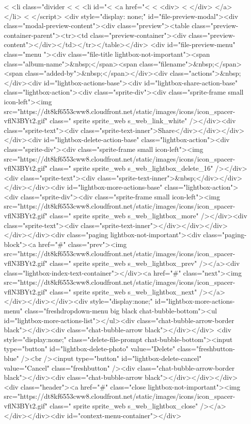 {<%
  <li class="divider <%
<%
  <li id="<%
    <a href="<%
      <%
      <div>
          <%
      </div>
    </a>
  </li>
<%
</script>
<div style="display: none;" id="file-preview-modal"><div class="modal-preview-content"><div class="preview"><table class="preview-container-parent"><tr><td class="preview-container"><div class="preview-content"></div></td></tr></table></div> <div id="file-preview-menu" class="menu "><div class="file-title lightbox-not-important"><span class="album-name">&nbsp;</span><span class="filename">&nbsp;</span><span class="added-by">&nbsp;</span></div><div class="actions">&nbsp;</div><div id="lightbox-actions-base"><div id="lightbox-share-action-base" class="lightbox-action"><div class="sprite-div"><div class="sprite-frame small icon-left"><img src="https://dt8kf6553cww8.cloudfront.net/static/images/icons/icon_spacer-vflN3BYt2.gif" class=" sprite sprite_web s_web_link_white" /></div><div class="sprite-text"><div class="sprite-text-inner">Share</div></div></div></div><div id="lightbox-delete-action-base" class="lightbox-action"><div class="sprite-div"><div class="sprite-frame small icon-left"><img src="https://dt8kf6553cww8.cloudfront.net/static/images/icons/icon_spacer-vflN3BYt2.gif" class=" sprite sprite_web s_web_lightbox_delete_16" /></div><div class="sprite-text"><div class="sprite-text-inner">&nbsp;</div></div></div></div><div id="lightbox-more-actions-base" class="lightbox-action"><div class="sprite-div"><div class="sprite-frame small icon-left"><img src="https://dt8kf6553cww8.cloudfront.net/static/images/icons/icon_spacer-vflN3BYt2.gif" class=" sprite sprite_web s_web_lightbox_more" /></div><div class="sprite-text"><div class="sprite-text-inner"></div></div></div></div></div><div class="paging lightbox-not-important"><div class="paging-block"><a href="#" class="prev"><img src="https://dt8kf6553cww8.cloudfront.net/static/images/icons/icon_spacer-vflN3BYt2.gif" class=" sprite sprite_web s_web_lightbox_prev" /></a><div class="lightbox-index-text-container"></div><a href="#" class="next"><img src="https://dt8kf6553cww8.cloudfront.net/static/images/icons/icon_spacer-vflN3BYt2.gif" class=" sprite sprite_web s_web_lightbox_next" /></a></div></div></div><div style="display:none;" id="lightbox-more-actions-menu" class="freshdropdown-menu big black chat-bubble-bottom"><ul id="lightbox-more-actions-list"></ul><div class="chat-bubble-arrow-border black"></div><div class="chat-bubble-arrow black"></div></div> <div style="display:none;" class="delete-file-prompt chat-bubble-bottom"><input type="button" id="lightbox-delete-photo" value="Delete" class="freshbutton-blue" /><br /><input type="button" id="lightbox-delete-cancel" value="Cancel" class="freshbutton" /><div class="chat-bubble-arrow-border black"></div><div class="chat-bubble-arrow black"></div></div></div><div class="header"><a href="#" class="close lightbox-not-important"><img src="https://dt8kf6553cww8.cloudfront.net/static/images/icons/icon_spacer-vflN3BYt2.gif" class=" sprite sprite_web s_web_lightbox_close" /></a></div></div><div id="context-menu-container"></div>
}
